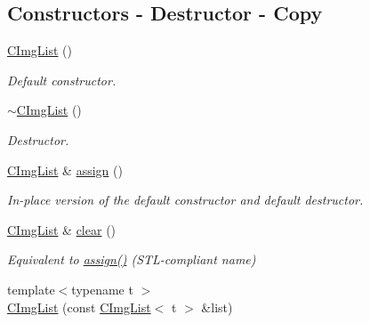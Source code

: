 \subsection*{Constructors -\/ Destructor -\/ Copy}
\begin{DoxyCompactItemize}
\item 
\hypertarget{structcimg__library_1_1_c_img_list_a2d39db2f68af51153f623c43afc655a1}{\hyperlink{structcimg__library_1_1_c_img_list_a2d39db2f68af51153f623c43afc655a1}{C\-Img\-List} ()}\label{structcimg__library_1_1_c_img_list_a2d39db2f68af51153f623c43afc655a1}

\begin{DoxyCompactList}\small\item\em Default constructor. \end{DoxyCompactList}\item 
\hypertarget{structcimg__library_1_1_c_img_list_a2bb17b7eec1c4b6eaddbb0e2af211dbb}{\hyperlink{structcimg__library_1_1_c_img_list_a2bb17b7eec1c4b6eaddbb0e2af211dbb}{$\sim$\-C\-Img\-List} ()}\label{structcimg__library_1_1_c_img_list_a2bb17b7eec1c4b6eaddbb0e2af211dbb}

\begin{DoxyCompactList}\small\item\em Destructor. \end{DoxyCompactList}\item 
\hypertarget{structcimg__library_1_1_c_img_list_a8531064785b0de93f45d78a42c919765}{\hyperlink{structcimg__library_1_1_c_img_list}{C\-Img\-List} \& \hyperlink{structcimg__library_1_1_c_img_list_a8531064785b0de93f45d78a42c919765}{assign} ()}\label{structcimg__library_1_1_c_img_list_a8531064785b0de93f45d78a42c919765}

\begin{DoxyCompactList}\small\item\em In-\/place version of the default constructor and default destructor. \end{DoxyCompactList}\item 
\hypertarget{structcimg__library_1_1_c_img_list_a96954dbde6c6fa7779d6979fb7b253ed}{\hyperlink{structcimg__library_1_1_c_img_list}{C\-Img\-List} \& \hyperlink{structcimg__library_1_1_c_img_list_a96954dbde6c6fa7779d6979fb7b253ed}{clear} ()}\label{structcimg__library_1_1_c_img_list_a96954dbde6c6fa7779d6979fb7b253ed}

\begin{DoxyCompactList}\small\item\em Equivalent to \hyperlink{structcimg__library_1_1_c_img_list_a8531064785b0de93f45d78a42c919765}{assign()} (S\-T\-L-\/compliant name) \end{DoxyCompactList}\item 
\hypertarget{structcimg__library_1_1_c_img_list_a26448b6799eb8fb6b2f8d2049a0c69a8}{{\footnotesize template$<$typename t $>$ }\\\hyperlink{structcimg__library_1_1_c_img_list_a26448b6799eb8fb6b2f8d2049a0c69a8}{C\-Img\-List} (const \hyperlink{structcimg__library_1_1_c_img_list}{C\-Img\-List}$<$ t $>$ \&list)}\label{structcimg__library_1_1_c_img_list_a26448b6799eb8fb6b2f8d2049a0c69a8}


\end{DoxyCompactItemize}
